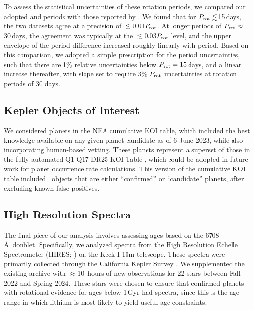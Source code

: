 \documentclass[11pt,twocolumn,tighten]{aastex63}
\begin{document}
To assess the statistical uncertainties of these rotation
periods, we compared our adopted  and
 periods with those reported by
\citet{McQuillan_2014}.  We found that for
$P_{\rm rot}\lesssim$15\,days, the two datasets agree at a precision
of $\lesssim$0.01$P_{\rm rot}$.  At longer periods of $P_{\rm
rot}\approx$30\,days, the agreement was typically at the
$\lesssim$0.03$P_{\rm rot}$ level, and the upper envelope of the
period difference increased roughly linearly with period.  Based on
this comparison, we adopted a simple prescription for the period
uncertainties, such that there are 1\% relative uncertainties below
$P_{\rm rot}=15$\,days, and a linear increase thereafter, with slope
set to require 3\% $P_{\rm rot}$ uncertainties at rotation periods
of 30 days.







\subsection{Kepler Objects of Interest}
\label{subsec:planetsel}

We considered planets in the NEA cumulative KOI
table, which included the best knowledge available on any given planet
candidate as of 6 June 2023, while also incorporating human-based
vetting. %
These planets represent a superset of those in the fully automated
Q1-Q17 DR25 KOI Table \citep{Thompson_2018}, which could be adopted in
future work for planet occurrence rate calculations.  This version of
the cumulative KOI table included \nkoisnofp\ objects that are either
``confirmed'' or ``candidate'' planets, after excluding known false
positives. 

\subsection{High Resolution Spectra}
\label{subsec:lithiumsel}

The final piece of our analysis involves assessing ages based on the
 6708\,\AA\ doublet.  Specifically,
we analyzed spectra from the High Resolution Echelle
Spectrometer (HIRES; \citealt{vogt_hires_1994}) on the Keck I 10m
telescope.  These spectra were primarily collected through the
California Kepler Survey
\citep{2017AJ....154..107P,2017AJ....154..108J,2017AJ....154..109F}.
We supplemented the existing archive with $\approx$10~hours of new
observations for 22 stars between Fall 2022 and Spring 2024.  These
stars were chosen to ensure that confirmed planets with rotational
evidence for ages below 1\,Gyr had spectra, since this is the age
range in which lithium is most likely to yield useful age constraints.
\end{document}
